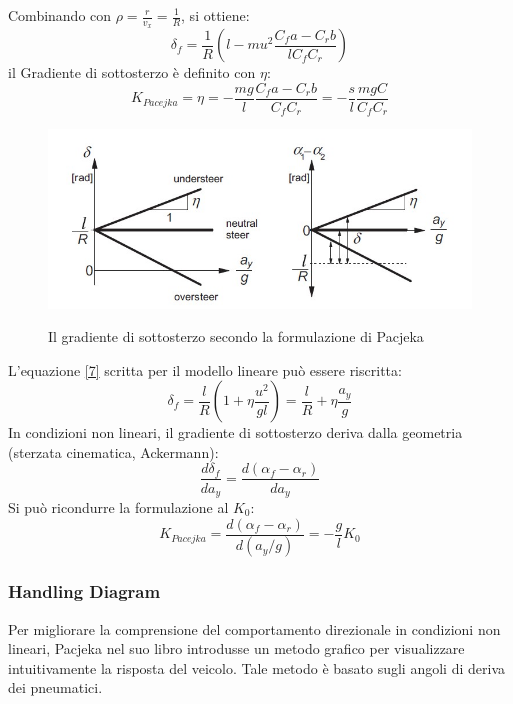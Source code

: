 Combinando con $\rho = \frac{r}{v_x} = \frac{1}{R}$, si ottiene:
\begin{equation} \label{8}
\delta_f = \frac{1}{R} (l - mu^2\frac{C_f a - C_r b}{l C_f C_r})
\end{equation}
il Gradiente di sottosterzo è definito con $\eta$:
\begin{equation}
    K_{Pacejka} = \eta = -\frac{mg}{l} \frac{C_fa-C_rb}{C_fC_r} = -\frac{s}{l} \frac{mgC}{C_fC_r}
\end{equation}
\begin{figure}[!h]
    \centering
    \includegraphics[scale=0.7]{Immagini/Understeer Gradient/Pacjeka understeer gradient.jpg}
    \label{fig:Pacjeka understeer gradient}
    \caption{Il gradiente di sottosterzo secondo la formulazione di Pacjeka}
\end{figure}
L'equazione \ref{7} scritta per il modello lineare può essere riscritta:\\
\begin{equation}
\delta_f = \frac{l}{R}( 1 + \eta\frac{u^2}{gl} ) = \frac{l}{R} + \eta \frac{a_y}{g}
\end{equation}
In condizioni non lineari, il gradiente di sottosterzo deriva dalla geometria (sterzata cinematica, Ackermann):\\
\begin{equation}
\frac{d\delta_f}{da_y} = \frac{d(\alpha_f - \alpha_r)}{da_y}
\end{equation}
Si può ricondurre la formulazione al $K_0$:
\begin{equation}
K_{Pacejka} = \frac{d(\alpha_f - \alpha_r)}{d(a_y/g)} = -\frac{g}{l} K_0
\end{equation}

\subsubsection{Handling Diagram}
Per migliorare la comprensione del comportamento direzionale in condizioni non lineari, Pacjeka nel suo libro
\cite{pacejka2005tire} introdusse un metodo grafico per visualizzare intuitivamente la risposta del veicolo.
Tale metodo è basato sugli angoli di deriva dei pneumatici.

